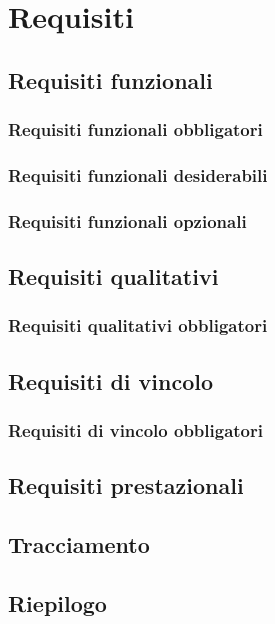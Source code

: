 \section{Requisiti}

\subsection{Requisiti funzionali}
\subsubsection{Requisiti funzionali obbligatori}
\subsubsection{Requisiti funzionali desiderabili}
\subsubsection{Requisiti funzionali opzionali}

\subsection{Requisiti qualitativi}
\subsubsection{Requisiti qualitativi obbligatori}

\subsection{Requisiti di vincolo}
\subsubsection{Requisiti di vincolo obbligatori}

\subsection{Requisiti prestazionali}

\subsection{Tracciamento}

\subsection{Riepilogo}
